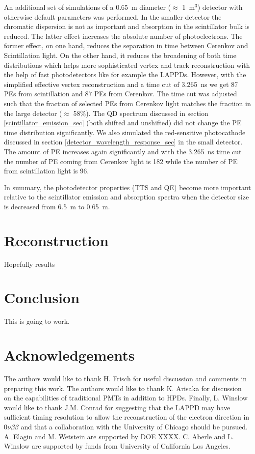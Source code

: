 \documentclass[aps,prc,twocolumn,groupedaddress,showpacs,amsmath,amssymb,floatfix,superscriptaddress]{revtex4}
\begin{document}
An additional set of simulations of a 0.65~m diameter ($\approx$ 1~m$^3$) detector with otherwise default parameters was performed. In the smaller detector the chromatic dispersion is not as important and absorption in the scintillator bulk is reduced. The latter effect increases the absolute number of photoelectrons. The former effect, on one hand, reduces the separation in time between Cerenkov and Scintillation light. On the other hand, it reduces the broadening of both time distributions which helps more sophisticated vertex and track reconstruction with the help of fast photodetectors like for example the LAPPDs. However, with the simplified effective vertex reconstruction and a time cut of 3.265~ns we get 87 PEs from scintillation and 87 PEs from Cerenkov. The time cut was adjusted such that the fraction of selected PEs from Cerenkov light matches the fraction in the large detector ($\approx$ 58\%). The QD spectrum discussed in section \ref{scintillator_emission_sec} (both shifted and unshifted) did not change the PE time distribution significantly. We also simulated the red-sensitive photocathode discussed in section \ref{detector_wavelength_response_sec} in the small detector. The amount of PE increases again significantly and with the 3.265~ns time cut the number of PE coming from Cerenkov light is 182 while the number of PE from scintillation light is 96. 

In summary, the photodetector properties (TTS and QE) become more important relative to the scintillator emission and absorption spectra when the detector size is decreased from 6.5~m to 0.65~m.


\section{Reconstruction}
\label{reconstruction_sec}
Hopefully results

\section{Conclusion}
This is going to work.

\section{Acknowledgements}
The authors would like to thank H. Frisch for useful discussion and comments in preparing this work. The authors would like to thank K. Arisaka for discussion on the capabilities of traditional PMTs in addition to HPDs. Finally, L. Winslow would like to thank J.M. Conrad for suggesting that the LAPPD may have sufficient timing resolution to allow the reconstruction of the electron direction in $0\nu\beta\beta$ and that a collaboration with the University of Chicago should be pursued.  A. Elagin and M. Wetstein are supported by DOE XXXX. C. Aberle and L. Winslow are supported by funds from University of California Los Angeles.



\end{document}
